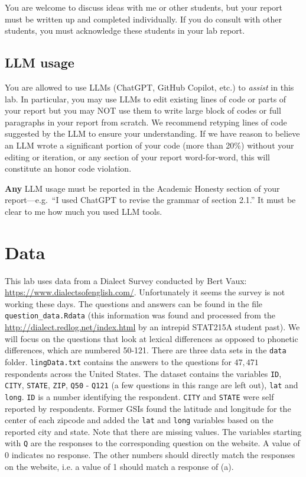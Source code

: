 \documentclass[letterpaper,12pt]{article}
\begin{document}
You are welcome to discuss ideas with me or other students, but your report must be written up and completed individually. If you do consult with other students, you must acknowledge these students in your lab report.

\subsection*{LLM usage}

You are allowed to use LLMs (ChatGPT, GitHub Copilot, etc.) to \textit{assist} in this lab. In particular, you may use LLMs to edit existing lines of code or parts of your report but you may NOT use them to write large block of codes or full paragraphs in your report from scratch. We recommend retyping lines of code suggested by the LLM to ensure your understanding. If we have reason to believe an LLM wrote a significant portion of your code (more than 20\%) without your editing or iteration, or any section of your report word-for-word, this will constitute an honor code violation.

\textbf{Any} LLM usage must be reported in the Academic Honesty section of your report---e.g.~``I used ChatGPT to revise the grammar of section 2.1.'' It must be clear to me how much you used LLM tools.

\section{Data}

This lab uses data from a Dialect Survey conducted by Bert Vaux: \url{https://www.dialectsofenglish.com/}. Unfortunately it seems the survey is not working these days. The questions and answers can be found in the file \texttt{question\_data.Rdata} (this information was found and processed from the \url{http://dialect.redlog.net/index.html} by an intrepid STAT215A student past). We will focus on the questions that look at lexical differences as opposed to phonetic differences, which are numbered 50-121. There are three data sets in the \texttt{data} folder. \texttt{lingData.txt} contains the answers to the questions for $47,471$ respondents across the United States. The dataset contains the variables \texttt{ID}, \texttt{CITY}, \texttt{STATE}, \texttt{ZIP}, \texttt{Q50} - \texttt{Q121} (a few questions in this range are left out), \texttt{lat} and \texttt{long}. \texttt{ID} is a number identifying the respondent. \texttt{CITY} and \texttt{STATE} were self reported by respondents. Former GSIs found the latitude and longitude for the center of each zipcode and added the \texttt{lat} and \texttt{long} variables based on the reported city and state. Note that there are missing values. The variables starting with \texttt{Q} are the responses to the corresponding question on the website. A value of 0 indicates no response. The other numbers should directly match the responses on the website, i.e. a value of 1 should match a response of (a).
\end{document}
